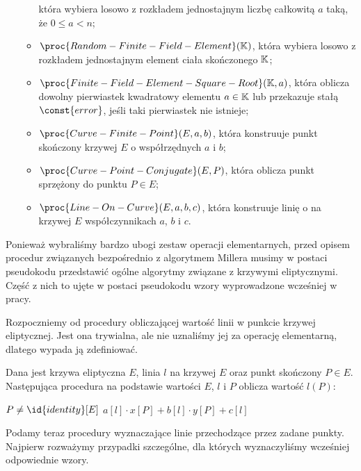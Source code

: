 \begin{remark}
\begin{itemize}
\begin{itemize}
która wybiera losowo z rozkładem jednostajnym
liczbę całkowitą $a$ taką, że $0 \leq a < n$;
\item $\proc{Random-Finite-Field-Element}(\K)$,
która wybiera losowo z rozkładem jednostajnym
element ciała skończonego $\mathbb{K}$;
\item $\proc{Finite-Field-Element-Square-Root}(\K, a)$,
która oblicza
dowolny pierwiastek kwadratowy elementu $a \in \mathbb{K}$
lub przekazuje stałą $\const{error}$, jeśli taki pierwiastek nie istnieje;
\item $\proc{Curve-Finite-Point}(E, a, b)$,
która konstruuje
punkt skończony krzywej $E$ o współrzędnych $a$ i $b$;
\item $\proc{Curve-Point-Conjugate}(E, P)$,
która oblicza
punkt sprzężony do punktu $P \in E$;
\item $\proc{Line-On-Curve}(E, a, b, c)$,
która konstruuje
linię o na krzywej $E$ współczynnikach $a$, $b$ i $c$.
\end{itemize}
\end{itemize}
\end{remark}

Ponieważ wybraliśmy bardzo ubogi zestaw operacji elementarnych,
przed opisem procedur związanych bezpośrednio z algorytmem Millera
musimy w postaci pseudokodu przedstawić
ogólne algorytmy związane z krzywymi eliptycznymi.
Część z nich to ujęte w postaci pseudokodu
wzory wyprowadzone wcześniej w pracy.

Rozpoczniemy od procedury obliczającej
wartość linii w punkcie krzywej eliptycznej.
Jest ona trywialna, ale nie uznaliśmy jej za operację elementarną,
dlatego wypada ją zdefiniować.

\begin{algorithm}
Dana jest krzywa eliptyczna $E$,
linia $l$ na krzywej $E$ oraz punkt skończony $P \in E$.
Następująca procedura
na podstawie wartości $E$, $l$ i $P$
oblicza
wartość $l(P)$:

\begin{codebox}
\li
    \Assert $P \neq \id{identity}[E]$
\li
    \Return $a[l]\cdot x[P] + b[l]\cdot y[P] + c[l]$
\end{codebox}
\end{algorithm}

Podamy teraz procedury wyznaczające linie przechodzące przez zadane punkty.
Najpierw rozważymy przypadki szczególne,
dla których wyznaczyliśmy wcześniej odpowiednie wzory.

